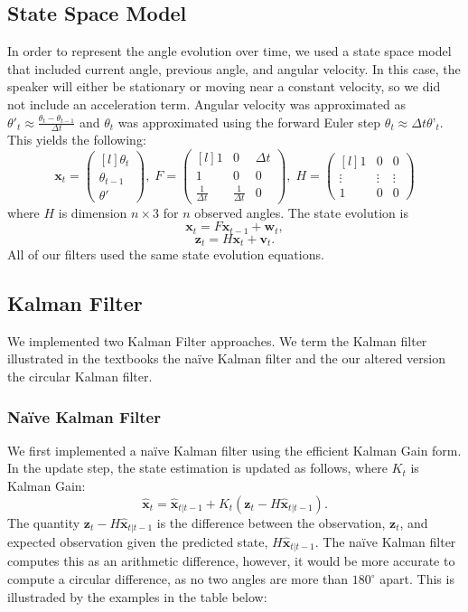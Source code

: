 \documentclass[11pt]{amsart}
\begin{document}
\subsection{State Space Model}
In order to represent the angle evolution over time, we used a state space model that included current angle, previous angle, and angular velocity. In this case, the speaker will either be stationary or moving near a constant velocity, so we did not include an acceleration term. Angular velocity was approximated as $\theta'_t \approx \frac{\theta_{t} - \theta_{t-1}}{\Delta t}$ and $\theta_t$ was approximated using the forward Euler step $\theta_t \approx \Delta t\theta’_{t}$. This yields the following:
\[\mathbf{x}_t = \begin{pmatrix*}[l]
    \theta_t \\
    \theta_{t-1} \\
    \theta'
\end{pmatrix*},\;  
F = \begin{pmatrix*}[l]
    1 & 0 & \Delta t \\
    1 & 0 & 0 \\
    \frac{1}{\Delta t} & \frac{1}{\Delta t} & 0
\end{pmatrix*},\;
H = \begin{pmatrix*}[l]
    1 & 0 & 0 \\
    \vdots & \vdots & \vdots\\
    1 & 0 & 0

\end{pmatrix*}\]
 where $H$ is dimension $n\times3$ for $n$ observed angles. The state evolution is
 \[\mathbf{x}_t = F\mathbf{x}_{t-1} + \mathbf{w}_t,\]
\[\mathbf{z}_t = H\mathbf{x}_t + \mathbf{v}_t.\]
All of our filters used the same state evolution equations.

\subsection{Kalman Filter}
We implemented two Kalman Filter\cite{V3}\cite{V3 Lab Manual} approaches. We term the Kalman filter illustrated in the textbooks the naïve Kalman filter and the our altered version the circular Kalman filter.

\subsubsection{Naïve Kalman Filter}
We first implemented a naïve Kalman filter using the efficient Kalman Gain form. In the update step, the state estimation is updated as follows, where $K_t$ is Kalman Gain: \[\mathbf{\hat{x}}_t = \mathbf{\hat{x}}_{t|t-1} + K_t(\mathbf{z}_t - H\mathbf{\hat{x}}_{t|t-1}).\] The quantity $\mathbf{z}_t - H\mathbf{\hat{x}}_{t|t-1}$ is the difference between the observation, $\mathbf{z}_t$, and expected observation given the predicted state, $H\mathbf{\hat{x}}_{t|t-1}$. The naïve Kalman filter computes this as an arithmetic difference, however, it would be more accurate to compute a circular difference, as no two angles are more than $180^{\circ}$ apart. This is illustraded by the examples in the table below:
\end{document}
